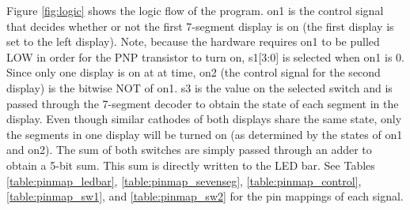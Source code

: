 \documentclass[11pt]{article}
\begin{document}
Figure \ref{fig:logic} shows the logic flow of the program. on1 is the control signal that decides whether or not the first 7-segment display is on (the first display is set to the left display). Note, because the hardware requires on1 to be pulled LOW in order for the PNP transistor to turn on, s1[3:0] is selected when on1 is 0. Since only one display is on at at time, on2 (the control signal for the second display) is the bitwise NOT of on1. s3 is the value on the selected switch and is passed through the 7-segment decoder to obtain the state of each segment in the display. Even though similar cathodes of both displays share the same state, only the segments in one display will be turned on (as determined by the states of on1 and on2). The sum of both switches are simply passed through an adder to obtain a 5-bit sum. This sum is directly written to the LED bar. See Tables \ref{table:pinmap_ledbar}, \ref{table:pinmap_sevenseg}, \ref{table:pinmap_control}, \ref{table:pinmap_sw1}, and \ref{table:pinmap_sw2} for the pin mappings of each signal. \\
\end{document}
